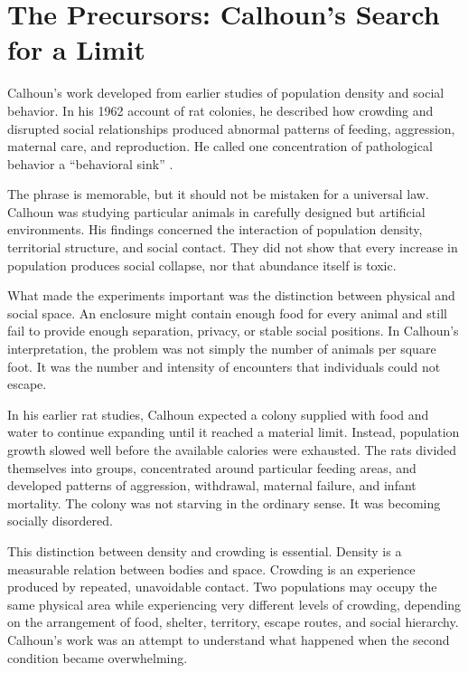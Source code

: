 ﻿\documentclass[12pt,a4paper]{book}
\begin{document}
\section{The Precursors: Calhoun's Search for a Limit}

Calhoun's work developed from earlier studies of population density and social behavior. In his 1962 account of rat colonies, he described how crowding and disrupted social relationships produced abnormal patterns of feeding, aggression, maternal care, and reproduction. He called one concentration of pathological behavior a ``behavioral sink'' \cite{calhoun1962}.

The phrase is memorable, but it should not be mistaken for a universal law. Calhoun was studying particular animals in carefully designed but artificial environments. His findings concerned the interaction of population density, territorial structure, and social contact. They did not show that every increase in population produces social collapse, nor that abundance itself is toxic.

What made the experiments important was the distinction between physical and social space. An enclosure might contain enough food for every animal and still fail to provide enough separation, privacy, or stable social positions. In Calhoun's interpretation, the problem was not simply the number of animals per square foot. It was the number and intensity of encounters that individuals could not escape.

In his earlier rat studies, Calhoun expected a colony supplied with food and water to continue expanding until it reached a material limit. Instead, population growth slowed well before the available calories were exhausted. The rats divided themselves into groups, concentrated around particular feeding areas, and developed patterns of aggression, withdrawal, maternal failure, and infant mortality. The colony was not starving in the ordinary sense. It was becoming socially disordered.

This distinction between density and crowding is essential. Density is a measurable relation between bodies and space. Crowding is an experience produced by repeated, unavoidable contact. Two populations may occupy the same physical area while experiencing very different levels of crowding, depending on the arrangement of food, shelter, territory, escape routes, and social hierarchy. Calhoun's work was an attempt to understand what happened when the second condition became overwhelming.
\end{document}
